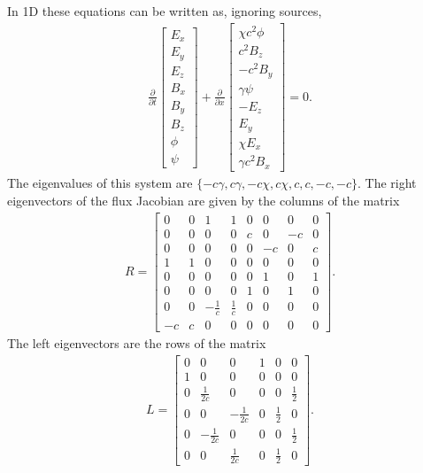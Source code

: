 \documentclass[11pt, reqno]{amsart}
\newcommand{\pfraca}[1]{\frac{\partial}{\partial #1}}
\theoremstyle{definition}
\begin{document}
In 1D these equations can be written as, ignoring sources,
\begin{align}
  \pfraca{t}
  \left[
    \begin{matrix}
      E_x \\
      E_y \\
      E_z \\
      B_x \\
      B_y \\
      B_z \\
      \phi \\
      \psi
    \end{matrix}
  \right]
  +
  \pfraca{x}
  \left[
    \begin{matrix}
      \chi c^2 \phi \\
      c^2B_z \\
      -c^2B_y \\
      \gamma \psi \\
      -E_z \\
      E_y \\
      \chi E_x \\
      \gamma c^2B_x
    \end{matrix}
  \right]
  =
  0.
\end{align}
The eigenvalues of this system are $\{-c\gamma, c\gamma, -c\chi,
c\chi, c, c, -c, -c\}$. The right eigenvectors of the flux Jacobian
are given by the columns of the matrix
\begin{align}
  R
  =
  \left[
    \begin{matrix}
      0  & 0 & 1 & 1 & 0 &  0 &  0 & 0 \\
      0  & 0 & 0 & 0 & c &  0 & -c & 0 \\
      0  & 0 & 0 & 0 & 0 & -c &  0 & c \\
      1  & 1 & 0 & 0 & 0 &  0 &  0 & 0 \\
      0  & 0 & 0 & 0 & 0 &  1 &  0 & 1 \\
      0  & 0 & 0 & 0 & 1 &  0 &  1 & 0 \\
      0  & 0 & -\frac{1}{c} & \frac{1}{c} & 0 &  0 &  0 & 0 \\
     -c  & c & 0 & 0 & 0 &  0 &  0 & 0
    \end{matrix}
  \right].
  \label{eq:ph_rev}
\end{align}
The left eigenvectors are the rows of the matrix
\begin{align}
  L
  =
  \left[
    \begin{matrix}
      0 & 0 & 0 & 1 & 0 & 0 \\
      1 & 0 & 0 & 0 & 0 & 0 \\
      0 & \frac{1}{2c} & 0 & 0 & 0 & \frac{1}{2} \\
      0 & 0 & -\frac{1}{2c} & 0 & \frac{1}{2} & 0 \\
      0 & -\frac{1}{2c} & 0 & 0 & 0 & \frac{1}{2} \\
      0 & 0 & \frac{1}{2c} & 0 & \frac{1}{2} & 0
    \end{matrix}
  \right].
  \label{eq:ph_lev}
\end{align}
\end{document}

